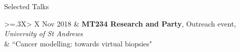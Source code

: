 \documentclass{resume} %
\begin{document}
\begin{rSection}{Selected Talks}
\begin{tabularx}{\linewidth}{>{\hsize=.3\hsize}X> {\hsize}X}
{Nov 2018} & {\bf MT234 Research and Party}, Outreach event, {\em University of St Andrews}  \\
& {``Cancer modelling: towards virtual biopsies"}  \\
\end{tabularx} 

\bigskip

\end{rSection} %
\end{document}
